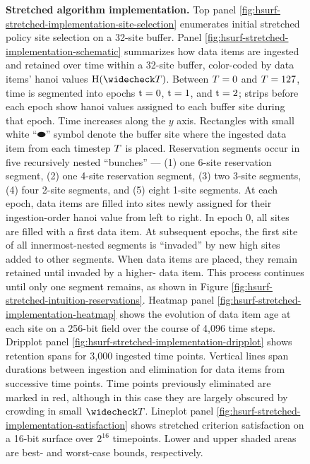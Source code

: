 \begin{figure}[htbp!]
\vspace{-2ex}\caption{%
  \textbf{Stretched algorithm implementation.}
  \footnotesize
  Top panel \ref{fig:hsurf-stretched-implementation-site-selection} enumerates initial stretched policy site selection on a 32-site buffer.
  Panel \ref{fig:hsurf-stretched-implementation-schematic} summarizes how data items are ingested and retained over time within a 32-site buffer, color-coded by data items' hanoi values $\colorH(\colorTbar)$.
  Between $\colorT=0$ and $\colorT=127$, time is segmented into epochs $\colort=0$, $\colort=1$, and $\colort=2$; strips before each epoch show hanoi values assigned to each buffer site during that epoch.
  Time increases along the $y$ axis.
  Rectangles with small white ``$\blkhorzoval$'' symbol denote the buffer site where the ingested data item from each timestep $\colorT$ is placed.
  Reservation segments occur in five recursively nested ``bunches'' --- (1) one 6-site reservation segment, (2) one 4-site reservation segment, (3) two 3-site segments, (4) four 2-site segments, and (5) eight 1-site segments.
  At each epoch, data items are filled into sites newly assigned for their ingestion-order hanoi value from left to right.
  In epoch 0, all sites are filled with a first data item.
  At subsequent epochs, the first site of all innermost-nested segments is ``invaded'' by new high \hv{} sites added to other segments.
  When data items are placed, they remain retained until invaded by a higher-\hv{} data item.
  This process continues until only one segment remains, as shown in Figure \ref{fig:hsurf-stretched-intuition-reservations}.
  Heatmap panel \ref{fig:hsurf-stretched-implementation-heatmap} shows the evolution of data item age at each site on a 256-bit field over the course of 4,096 time steps.
  Dripplot panel \ref{fig:hsurf-stretched-implementation-dripplot} shows retention spans for 3,000 ingested time points.
  Vertical lines span durations between ingestion and elimination for data items from successive time points.
  Time points previously eliminated are marked in red, although in this case they are largely obscured by crowding in small $\colorTbar$.
  Lineplot panel \ref{fig:hsurf-stretched-implementation-satisfaction} shows stretched criterion satisfaction on a 16-bit surface over $2^{16}$ timepoints.
  Lower and upper shaded areas are best- and worst-case bounds, respectively.
  }
\label{fig:hsurf-stretched-implementation}

\end{figure}

